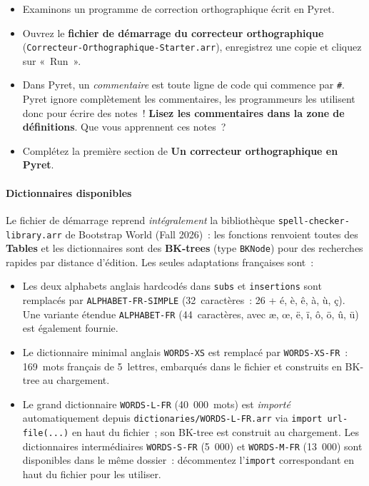 \documentclass[12pt,a4paper]{article}
\begin{document}
\begin{activitybox}
  \begin{itemize}
    \item Examinons un programme de correction orthographique écrit en Pyret.
    \item Ouvrez le \textbf{fichier de démarrage du correcteur orthographique} (\texttt{Correcteur\allowbreak-Orthographique\allowbreak-Starter\allowbreak.arr}), enregistrez une copie et cliquez sur «~Run~».
    \item Dans Pyret, un \emph{commentaire} est toute ligne de code qui commence par \texttt{\#}. Pyret ignore complètement les commentaires, les programmeurs les utilisent donc pour écrire des notes~! \textbf{Lisez les commentaires dans la zone de définitions}. Que vous apprennent ces notes~?
    \item Complétez la première section de \textbf{Un correcteur orthographique en Pyret}.
  \end{itemize}
\end{activitybox}

\paragraph{Dictionnaires disponibles}

Le fichier de démarrage reprend \emph{intégralement} la bibliothèque \texttt{spell-checker-library.arr} de Bootstrap World (Fall 2026)~: les fonctions renvoient toutes des \textbf{Tables} et les dictionnaires sont des \textbf{BK-trees} (type \texttt{BKNode}) pour des recherches rapides par distance d'édition. Les seules adaptations françaises sont~:
\begin{itemize}
  \item Les deux alphabets anglais hardcodés dans \texttt{subs} et \texttt{insertions} sont remplacés par \texttt{ALPHABET-FR-SIMPLE} (32~caractères~: 26 + é, è, ê, à, ù, ç). Une variante étendue \texttt{ALPHABET-FR} (44~caractères, avec æ, œ, ë, ï, ô, ö, û, ü) est également fournie.
  \item Le dictionnaire minimal anglais \texttt{WORDS-XS} est remplacé par \texttt{WORDS-XS-FR}~: 169~mots français de 5~lettres, embarqués dans le fichier et construits en BK-tree au chargement.
  \item Le grand dictionnaire \texttt{WORDS-L-FR} (40~000~mots) est \emph{importé} automatiquement depuis \texttt{dictionaries/WORDS-L-FR.arr} via \texttt{import url-file(...)} en haut du fichier~; son BK-tree est construit au chargement. Les dictionnaires intermédiaires \texttt{WORDS-S-FR} (5~000) et \texttt{WORDS-M-FR} (13~000) sont disponibles dans le même dossier~: décommentez l'\texttt{import} correspondant en haut du fichier pour les utiliser.
\end{itemize}
\end{document}
